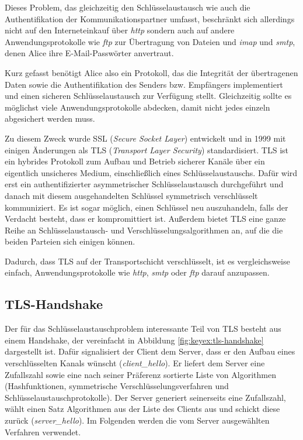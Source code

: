 Dieses Problem, das gleichzeitig den Schlüsselaustausch wie auch die Authentifikation der Kommunikationspartner umfasst, beschränkt sich allerdings nicht auf
den Interneteinkauf über \emph{http} sondern auch auf andere Anwendungsprotokolle wie \emph{ftp} zur Übertragung von Dateien und \emph{imap} und \emph{smtp},
denen Alice ihre E-Mail-Passwörter anvertraut.

Kurz gefasst benötigt Alice also ein Protokoll, das die Integrität der übertragenen Daten sowie die Authentifikation des Senders bzw. Empfängers implementiert
und einen sicheren Schlüsselaustausch zur Verfügung stellt. Gleichzeitig sollte es möglichst viele Anwendungsprotokolle abdecken, damit nicht jedes einzeln
abgesichert werden muss.

Zu diesem Zweck wurde SSL (\emph{Secure Socket Layer}) entwickelt und in 1999 mit einigen Änderungen als TLS (\emph{Transport Layer Security}) standardisiert.
TLS ist ein hybrides Protokoll zum Aufbau und Betrieb sicherer Kanäle über ein eigentlich unsicheres Medium, einschließlich eines Schlüsselaustauschs.
Dafür wird erst ein authentifizierter asymmetrischer Schlüsselaustausch durchgeführt und danach mit diesem ausgehandelten Schlüssel symmetrisch
verschlüsselt kommuniziert. Es ist sogar möglich, einen Schlüssel neu auszuhandeln, falls der Verdacht besteht, dass er kompromittiert
ist. Außerdem bietet TLS eine ganze Reihe an Schlüsselaustausch- und Verschlüsselungsalgorithmen an, auf die die beiden Parteien sich
einigen können.

Dadurch, dass TLS auf der Transportschicht verschlüsselt, ist es vergleichsweise einfach, Anwendungsprotokolle wie \emph{http}, \emph{smtp} oder \emph{ftp}
darauf anzupassen.

\subsection{TLS-Handshake}
Der für das Schlüsselaustauschproblem interessante Teil von TLS besteht aus einem Handshake, der vereinfacht in Abbildung \ref{fig:keyex:tls-handshake}
dargestellt ist.
Dafür signalisiert der Client dem Server, dass er den Aufbau eines verschlüsselten Kanals wünscht (\emph{client\_hello}). Er liefert
dem Server eine Zufallszahl sowie eine nach seiner Präferenz sortierte Liste von Algorithmen (Hashfunktionen, symmetrische
Verschlüsselungsverfahren und Schlüsselaustauschprotokolle). Der Server generiert seinerseits eine Zufallszahl, wählt einen Satz
Algorithmen aus der Liste des Clients aus und schickt diese zurück (\emph{server\_hello}). Im Folgenden werden die vom Server ausgewählten
Verfahren verwendet.


